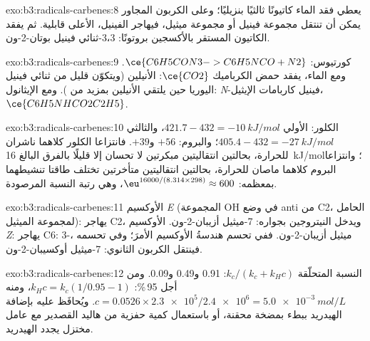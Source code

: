 \begin{solution}{exo:b3:radicals-carbenes:8}
يعطي فقد الماء كاتيونًا ثالثيًا بنزيليًا؛ وعلى الكربون المجاور يمكن أن تنتقل مجموعة فينيل
أو مجموعة ميثيل، فيهاجر الفينيل، الأعلى قابلية. ثم يفقد الكاتيون
المستقر بالأكسجين بروتونًا: 3،3-ثنائي فينيل بوتان-2-ون.
\end{solution}

\begin{solution}{exo:b3:radicals-carbenes:9}
كورتيوس: $\ce{C6H5CON3 -> C6H5NCO + N2}$. ومع الماء، يفقد حمض الكرباميك $\ce{CO2}$: الأنيلين
(ويتكوّن قليل من ثنائي فينيل اليوريا حين يلتقي الأنيلين بمزيد من ). ومع الإيثانول:
\textit{N}-فينيل كاربامات الإيثيل، $\ce{C6H5NHCO2C2H5}$.
\end{solution}

\begin{solution}{exo:b3:radicals-carbenes:10}
الكلور: الأولي $421.7 - 432 = \qty{-10}{kJ/mol}$، والثالثي $405.4 - 432 = \qty{-27}{kJ/mol}$؛ والبروم: $+56$ 
و$+39$. فانتزاعا الكلور كلاهما ناشران للحرارة، بحالتين انتقاليتين مبكرتين
لا تحسان إلا قليلًا بالفرق البالغ \qty{16}{kJ/mol}؛ وانتزاعا البروم كلاهما ماصان للحرارة،
بحالتين انتقاليتين متأخرتين تختلف طاقتا تنشيطهما بمعظمه:
$\eu^{16000/(8.314 \times 298)} \approx 600$، وهي رتبة النسبة المرصودة.
\end{solution}

\begin{solution}{exo:b3:radicals-carbenes:11}
الأوكسيم \textit{E} (المجموعة OH في وضع anti من C2، الحامل لمجموعة الميثيل): يهاجر C2، ويدخل النيتروجين
بجواره: 7-ميثيل أزيبان-2-ون. الأوكسيم \textit{Z}: يهاجر C6: 3-ميثيل أزيبان-2-ون. ففي
 تحسم هندسةُ الأوكسيم الأمرَ؛ وفي 
تحسمه ، فينتقل الكربون الثانوي:
7-ميثيل أوكسيبان-2-ون.
\end{solution}

\begin{solution}{exo:b3:radicals-carbenes:12}
النسبة المتحلّقة $k_c/(k_c + k_H c)$: 0.91 و0.49 و0.09. ومن أجل 95\,\%: $k_Hc = k_c(1/0.95 - 1)$، ومنه
$c = 0.0526 \times \num{2.3e5}/\num{2.4e6} = \qty{5.0e-3}{mol/L}$. ويُحافَظ عليه بإضافة الهيدريد ببطء
بمضخة محقنة، أو باستعمال كمية حفزية من هاليد القصدير مع عامل مختزل
يجدد الهيدريد.
\end{solution}

